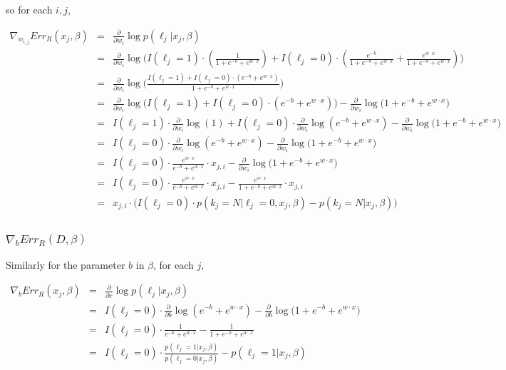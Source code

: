 \documentclass{article}
\begin{document}
so for each $i,j$,


\begin{eqnarray*}
\nabla_{w_{i,j}}{Err_R (x_j, \beta)} &=& \frac{\partial}{\partial w_i}\log{p(\ell_j | x_j, \beta)} \\
 &=& \frac{\partial}{\partial w_i}
		\log{\Bigg(
			I(\ell_j=1) \cdot \left( \frac{1}{1 + e^{-b} + e^{w \cdot x}} \right) + 
			I(\ell_j=0) \cdot \left(\frac{e^{-b}}{1 + e^{-b} + e^{w \cdot x}} + \frac{e^{w \cdot x}}{1 + e^{-b} + e^{w \cdot x}} \right)
		\Bigg)} \\
 &=& \frac{\partial}{\partial w_i}
		\log{\Bigg(
		    \frac{
			I(\ell_j=1) + 
			I(\ell_j=0) \cdot \left( e^{-b} + e^{w \cdot x} \right)
		     }{1 + e^{-b} + e^{w \cdot x}}
		\Bigg)} \\
 &=& \frac{\partial}{\partial w_i}
		\log{\bigg(
			I(\ell_j=1) + 
			I(\ell_j=0) \cdot \left( e^{-b} + e^{w \cdot x} \right)
		\bigg)}
		- \frac{\partial}{\partial w_i}
		 \log{\bigg(
			1 + e^{-b} + e^{w \cdot x}
		\bigg)} \\
 &=& I(\ell_j=1) \cdot \frac{\partial}{\partial w_i}
		\log{(1)} +
    I(\ell_j=0) \cdot \frac{\partial}{\partial w_i}
		\log{ \left( e^{-b} + e^{w \cdot x} \right) }
		- \frac{\partial}{\partial w_i}
		 \log{\bigg(
			1 + e^{-b} + e^{w \cdot x}
		\bigg)} \\
 &=& I(\ell_j=0) \cdot \frac{\partial}{\partial w_i}
		\log{  \left( e^{-b} + e^{w \cdot x} \right) }
		- \frac{\partial}{\partial w_i}
		 \log{\bigg(
			1 + e^{-b} + e^{w \cdot x}
		\bigg)} \\
 &=& I(\ell_j=0) \cdot 
 		\frac{
			e^{w \cdot x}
		}{
			e^{-b} + e^{w \cdot x}
		} \cdot x_{j,i}
		- \frac{\partial}{\partial w_i}
		 \log{\Big(
			1 + e^{-b} + e^{w \cdot x}
		\Big)} \\
 &=& I(\ell_j=0) \cdot 
 		\frac{
			e^{w \cdot x}
		}{
			e^{-b} + e^{w \cdot x}
		} \cdot x_{j,i}
		- \frac{e^{w \cdot x}}{
			1 + e^{-b} + e^{w \cdot x}
		} \cdot x_{j,i} \\
 &=& x_{j,i} \cdot
    \big(	I(\ell_j=0) \cdot p(k_j=N | \ell_j=0, x_j, \beta) - 
		p(k_j=N | x_j, \beta)
    \big) \\
\end{eqnarray*}

\subsubsection{$ \nabla_{b}{Err_R (D, \beta)}$}

Similarly for the parameter $b$ in $\beta$, for each $j$,

\begin{eqnarray*}
\nabla_{b}{Err_R (x_j, \beta)} &=& \frac{\partial}{\partial c}\log{p(\ell_j | x_j, \beta)} \\
 &=& I(\ell_j=0) \cdot \frac{\partial}{\partial b}
		\log{  \left( e^{-b} + e^{w \cdot x} \right) }
		- \frac{\partial}{\partial b}
		 \log{\bigg(
			1 + e^{-b} + e^{w \cdot x}
		\bigg)} \\
 &=& I(\ell_j=0) \cdot
		\frac{1}{e^{-b} + e^{w \cdot x}}
		-
		 \frac{1}{
			1 + e^{-b} + e^{w \cdot x}
		} \\
 &=& I(\ell_j=0) \cdot
		\frac{p(\ell_j=1 | x_j,\beta)}{p(\ell_j=0 | x_j,\beta)}
		-
		 p(\ell_j=1 | x_j,\beta)
\end{eqnarray*}
\end{document}
